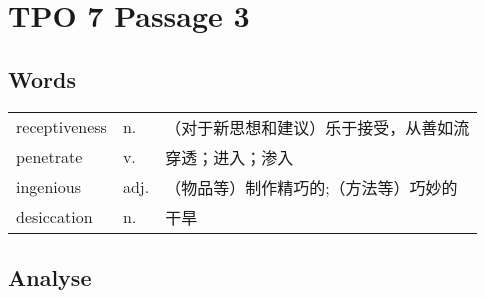 \section{TPO 7 Passage 3}

\subsection{Words}

\begin{tabular}{lll}
    receptiveness & n.   & （对于新思想和建议）乐于接受，从善如流 \\
    penetrate     & v.   & 穿透；进入；渗入            \\
    ingenious     & adj. & （物品等）制作精巧的;（方法等）巧妙的 \\
    desiccation   & n.   & 干旱                  \\
\end{tabular}

\subsection{Analyse}

